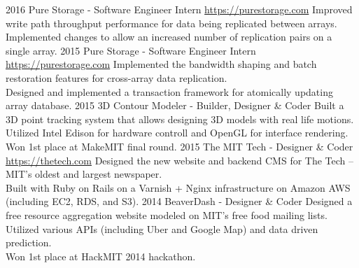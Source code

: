 \documentclass[]{friggeri-cv} %
\begin{document}
\begin{entrylist}
  \entry
  {2016}
  {Pure Storage - Software Engineer Intern}
  {\href{https://purestorage.com}{https://purestorage.com}}
  {Improved write path throughput performance for data being replicated between arrays. \\
  Implemented changes to allow an increased number of replication pairs on a single array. }
  \entry
  {2015}
  {Pure Storage - Software Engineer Intern}
  {\href{https://purestorage.com}{https://purestorage.com}}
  {Implemented the bandwidth shaping and batch restoration features for cross-array data replication. \\
  Designed and implemented a transaction framework for atomically updating array database. }
  \entry
  {2015}
  {3D Contour Modeler - Builder, Designer \& Coder}
  {}
  {Built a 3D point tracking system that allows designing 3D models with real life motions. \\
  Utilized Intel Edison for hardware controll and OpenGL for interface rendering. \\
  Won 1st place at MakeMIT final round. }
  \entry
  {2015}
  {The MIT Tech - Designer \& Coder}
  {\href{https://thetech.com}{https://thetech.com}}
  {Designed the new website and backend CMS for The Tech -- MIT's oldest and largest newspaper. \\
  Built with Ruby on Rails on a Varnish + Nginx infrastructure on Amazon AWS (including EC2, RDS, and S3). }
  \entry
  {2014}
  {BeaverDash - Designer \& Coder}
  {}
  {Designed a free resource aggregation website modeled on MIT's free food mailing lists. \\
  Utilized various APIs (including Uber and Google Map) and data driven prediction. \\
  Won 1st place at HackMIT 2014 hackathon. }

\end{entrylist}
\end{document}
